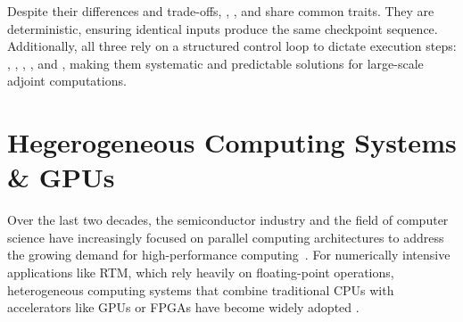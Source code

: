 \documentclass[Ingles,Final]{ic-tese-v3}
\begin{document}
Despite their differences and trade-offs, \revolve, \zcut, and \uniform share common traits. They are deterministic, ensuring identical inputs produce the same checkpoint sequence. Additionally, all three rely on a structured control loop to dictate execution steps: \fwd, \save, \restore, \bwd, and \terminate, making them systematic and predictable solutions for large-scale adjoint computations. 




\section{Hegerogeneous Computing Systems \& GPUs} %
\label{sec:gpus}

Over the last two decades, the semiconductor industry and the field of computer science have increasingly focused on parallel computing architectures to address the growing demand for high-performance computing~\cite{hennessy}. For numerically intensive applications like RTM, which rely heavily on floating-point operations, heterogeneous computing systems that combine traditional CPUs with accelerators like GPUs or FPGAs have become widely adopted \cite{dussand2008,liu2012,rigon2024}.
\end{document}
